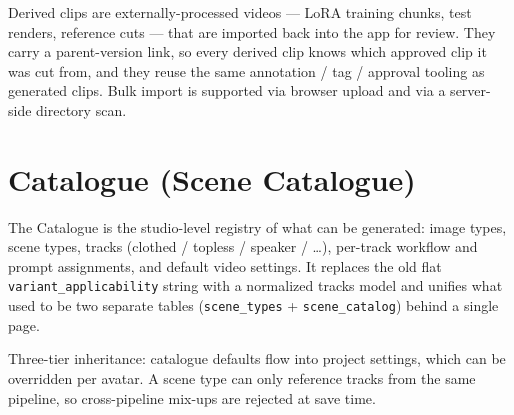 Derived clips are externally-processed videos — LoRA training chunks, test renders,
reference cuts — that are imported back into the app for review. They carry a
parent-version link, so every derived clip knows which approved clip it was cut
from, and they reuse the same annotation / tag / approval tooling as generated
clips. Bulk import is supported via browser upload and via a server-side directory
scan.


\begin{itemize}
\end{itemize}


\section{Catalogue (Scene Catalogue)}
\label{sec:content-catalogue}

The Catalogue is the studio-level registry of what can be generated: image types,
scene types, tracks (clothed / topless / speaker / …), per-track workflow and
prompt assignments, and default video settings. It replaces the old flat
\texttt{variant\_applicability} string with a normalized tracks model and unifies
what used to be two separate tables (\texttt{scene\_types} + \texttt{scene\_catalog})
behind a single page.

\begin{designnote}
Three-tier inheritance: catalogue defaults flow into project settings, which can
be overridden per avatar. A scene type can only reference tracks from the same
pipeline, so cross-pipeline mix-ups are rejected at save time.
\end{designnote}


\begin{itemize}
\end{itemize}

